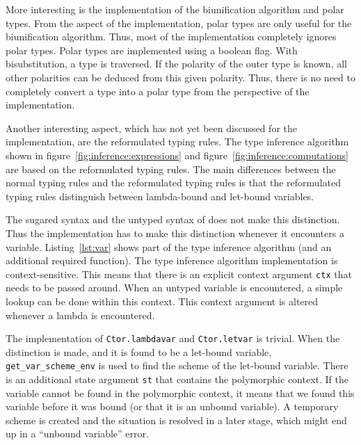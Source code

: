 More interesting is the implementation of the biunification algorithm and polar types. From the aspect of the implementation, polar types are only useful for the biunification algorithm. Thus, most of the implementation completely ignores polar types. Polar types are implemented using a boolean flag. With bisubstitution, a type is traversed. If the polarity of the outer type is known, all other polarities can be deduced from this given polarity. Thus, there is no need to completely convert a type into a polar type from the perspective of the implementation.

Another interesting aspect, which has not yet been discussed for the implementation, are the reformulated typing rules. The type inference algorithm shown in figure~\ref{fig:inference:expressions} and figure~\ref{fig:inference:computations} are based on the reformulated typing rules. The main differences between the normal typing rules and the reformulated typing rules is that the reformulated typing rules distinguish between lambda-bound and let-bound variables.

The sugared syntax and the untyped syntax of \eff does not make this distinction. Thus the implementation has to make this distinction whenever it encounters a variable. Listing~\ref{lst:var} shows part of the type inference algorithm (and an additional required function). The type inference algorithm implementation is context-sensitive. This means that there is an explicit context argument \lstinline{ctx} that needs to be passed around. When an untyped variable is encountered, a simple lookup can be done within this context. This context argument is altered whenever a lambda is encountered. 

The implementation of \lstinline{Ctor.lambdavar} and \lstinline{Ctor.letvar} is trivial. When the distinction is made, and it is found to be a let-bound variable, \lstinline{get_var_scheme_env} is used to find the scheme of the let-bound variable. There is an additional state argument \lstinline{st} that contains the polymorphic context. If the variable cannot be found in the polymorphic context, it means that we found this variable before it was bound (or that it is an unbound variable). A temporary scheme is created and the situation is resolved in a later stage, which might end up in a ``unbound variable'' error.

